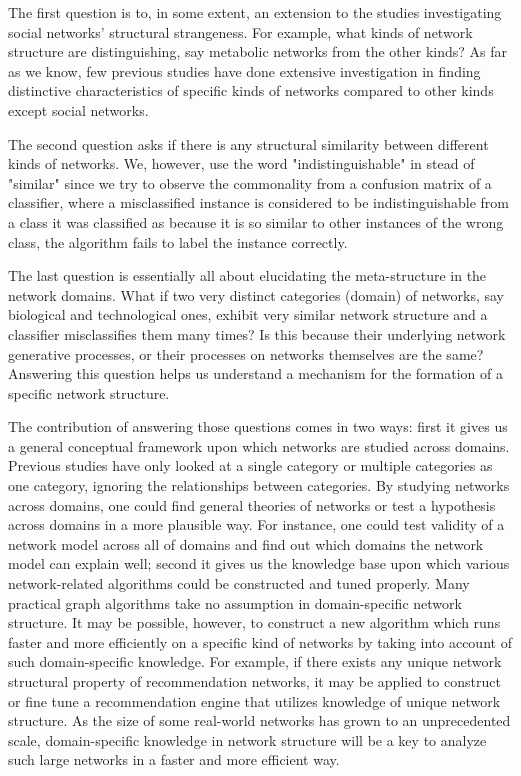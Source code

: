 \documentclass{article}
\begin{document}
The first question is to, in some extent, an extension to the studies investigating social networks' structural strangeness. For example, what kinds of network structure are distinguishing, say metabolic networks from the other kinds? As far as we know, few previous studies have done extensive investigation in finding distinctive characteristics of specific kinds of networks compared to other kinds except social networks.

The second question asks if there is any structural similarity between different kinds of networks. We, however, use the word "indistinguishable" in stead of "similar" since we try to observe the commonality from a confusion matrix of a classifier, where a misclassified instance is considered to be indistinguishable from a class it was classified as because it is so similar to other instances of the wrong class, the algorithm fails to label the instance correctly.


The last question is essentially all about elucidating the meta-structure in the network domains. What if two very distinct categories (domain) of networks, say biological and technological ones, exhibit very similar network structure and a classifier misclassifies them many times? Is this because their underlying network generative processes, or their processes on networks themselves are the same? Answering this question helps us understand a mechanism for the formation of a specific network structure.


The contribution of answering those questions comes in two ways: first it gives us a general conceptual framework upon which networks are studied across domains. Previous studies have only looked at a single category or multiple categories as one category, ignoring the relationships between categories. By studying networks across domains, one could find general theories of networks or test a hypothesis across domains in a more plausible way.  For instance, one could test validity of a network model across all of domains and find out which domains the network model can explain well; second it gives us the knowledge base upon which various network-related algorithms could be constructed and tuned properly.  Many practical graph algorithms take no assumption in domain-specific network structure. It may be possible, however, to construct a new algorithm which runs faster and more efficiently on a specific kind of networks by taking into account of such domain-specific knowledge. For example, if there exists any unique network structural property of recommendation networks,  it may be applied to construct or fine tune a recommendation engine that utilizes knowledge of unique network structure. As the size of some real-world networks has grown to an unprecedented scale, domain-specific knowledge in network structure will be a key to analyze such large networks in a faster and more efficient way.
\end{document}
